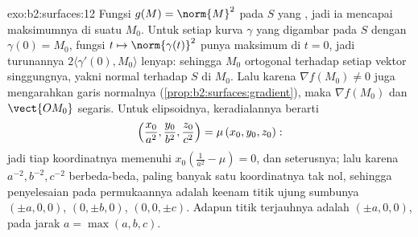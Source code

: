 \begin{solution}{exo:b2:surfaces:12}
Fungsi $g(M) = \norm{M}^2$  pada $S$ yang ,
jadi ia mencapai maksimumnya di suatu $M_0$. Untuk setiap kurva
$\gamma$ yang digambar pada $S$ dengan $\gamma(0) = M_0$, fungsi $t
\mapsto \norm{\gamma(t)}^2$ punya maksimum di $t = 0$, jadi
turunannya $2\langle\gamma'(0), M_0\rangle$ lenyap: sehingga $M_0$
ortogonal terhadap setiap vektor singgungnya, yakni normal terhadap $S$ di
$M_0$. Lalu karena $\nabla f(M_0) \neq 0$ juga mengarahkan garis normalnya
(\cref{prop:b2:surfaces:gradient}), maka $\nabla f(M_0)$ dan
$\vect{OM_0}$ segaris. Untuk elipsoidnya, keradialannya
berarti
\[
\Bigl(\frac{x_0}{a^2}, \frac{y_0}{b^2},
\frac{z_0}{c^2}\Bigr) = \mu\,(x_0, y_0, z_0) :
\]
jadi tiap koordinatnya memenuhi $x_0(\frac1{a^2} - \mu) = 0$, dan seterusnya;
lalu karena $a^{-2}, b^{-2}, c^{-2}$ berbeda-beda, paling banyak satu
koordinatnya tak nol, sehingga penyelesaian pada permukaannya adalah
keenam titik ujung sumbunya $(\pm a, 0, 0)$, $(0, \pm b, 0)$, $(0,
0, \pm c)$. Adapun titik terjauhnya adalah $(\pm a, 0, 0)$, pada
jarak $a = \max(a,b,c)$.
\end{solution}


